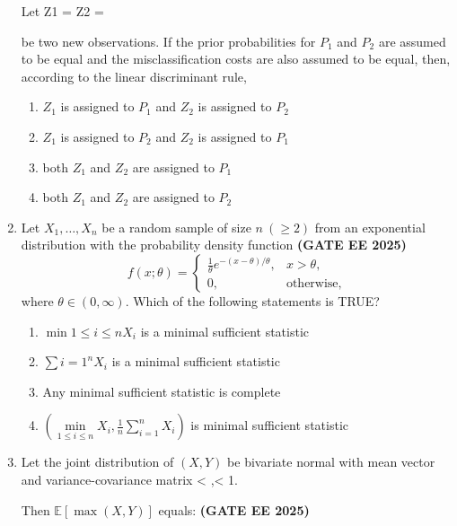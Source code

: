 \documentclass[journal,12pt,onecolumn]{IEEEtran}
\theoremstyle{remark}
\begin{document}
\begin{enumerate}
Let 
Z{1} =
\quad 
Z{2} = 

be two new observations. If the prior probabilities for $P_{1}$ and $P_{2}$ are assumed to be equal and the misclassification costs are also assumed to be equal, then, according to the linear discriminant rule, 

\begin{enumerate}
\item $Z_{1}$ is assigned to $P_{1}$ and $Z_{2}$ is assigned to $P_{2}$
\item $Z_{1}$ is assigned to $P_{2}$ and $Z_{2}$ is assigned to $P_{1}$
\item both $Z_{1}$ and $Z_{2}$ are assigned to $P_{1}$
\item both $Z_{1}$ and $Z_{2}$ are assigned to $P_{2}$
\end{enumerate}

\item Let $X_1, \ldots, X_n$ be a random sample of size $n \ (\geq 2)$ from an exponential distribution with the probability density function \hfill \textbf{(GATE EE 2025)}
\[
f(x;\theta) = 
\begin{cases}
\frac{1}{\theta} e^{-(x-\theta)/\theta}, & x > \theta, \\
0, & \text{otherwise},
\end{cases}
\]
where $\theta \in (0, \infty)$. Which of the following statements is TRUE?

\begin{enumerate}
    \item $\min\limits {1 \leq i \leq n} X_i$ is a minimal sufficient statistic
    \item $\sum\limits {i=1}^n X_i$ is a minimal sufficient statistic
    \item Any minimal sufficient statistic is complete
    \item $\left( \min\limits_{1 \leq i \leq n} X_i , \frac{1}{n} \sum\limits_{i=1}^n X_i \right)$ is minimal sufficient statistic
\end{enumerate}

\item Let the joint distribution of $(X,Y)$ be bivariate normal with mean vector  and variance-covariance matrix 
  < ,< 1.

Then $\mathbb{E}[\max(X,Y)]$ equals: \hfill \textbf{(GATE EE 2025)}


\end{enumerate}
\end{document}
